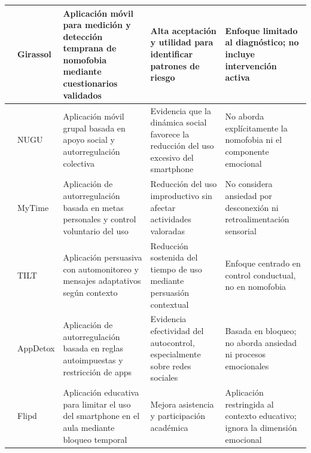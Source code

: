 {\begin{longtable}{c p{3cm} p{3cm} p{3cm} p{3cm}}
        \hline

        \cite{CunhaSouzaSantiago2020} & Girassol & Aplicación móvil para medición y detección temprana de nomofobia mediante cuestionarios validados & Alta aceptación y utilidad para identificar patrones de riesgo & Enfoque limitado al diagnóstico; no incluye intervención activa \\

        \hline

        \cite{KoYangLee2015} & NUGU & Aplicación móvil grupal basada en apoyo social y autorregulación colectiva &Evidencia que la dinámica social favorece la reducción del uso excesivo del smartphone & No aborda explícitamente la nomofobia ni el componente emocional \\

        \hline

        \cite{Hiniker2016} & MyTime & Aplicación de autorregulación basada en metas personales y control voluntario del uso & Reducción del uso improductivo sin afectar actividades valoradas & No considera ansiedad por desconexión ni retroalimentación sensorial \\

        \hline

        \cite{FoulonneauCalvaryVillain2016} & TILT & Aplicación persuasiva con automonitoreo y mensajes adaptativos según contexto & Reducción sostenida del tiempo de uso mediante persuasión contextual & Enfoque centrado en control conductual, no en nomofobia \\

        \hline

        \cite{LoechtefeldBoehmerGanev2013} & AppDetox & Aplicación de autorregulación basada en reglas autoimpuestas y restricción de apps & Evidencia efectividad del autocontrol, especialmente sobre redes sociales & Basada en bloqueo; no aborda ansiedad ni procesos emocionales \\

        \hline

        \cite{Neuwirth2020} & Flipd & Aplicación educativa para limitar el uso del smartphone en el aula mediante bloqueo temporal & Mejora asistencia y participación académica & Aplicación restringida al contexto educativo; ignora la dimensión emocional \\

        \hline
    \end{longtable}
}